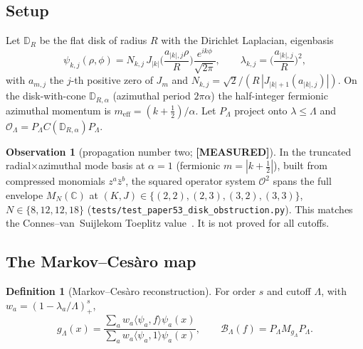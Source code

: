 \documentclass[11pt,a4paper]{article}
\theoremstyle{plain}
\theoremstyle{definition}
\newtheorem{definition}[theorem]{Definition}
\newtheorem{observation}[theorem]{Observation}
\newcommand{\disk}{\mathbb{D}}
\newcommand{\diskR}{\disk_{R}}
\newcommand{\cone}{\disk_{R,\alpha}}
\newcommand{\Op}{\mathcal{O}}
\newcommand{\Berez}{\mathcal{B}}
\newcommand{\C}{\mathbb{C}}
\begin{document}
\subsection{Setup}
Let $\diskR$ be the flat disk of radius $R$ with the Dirichlet Laplacian,
eigenbasis
\begin{equation}
\psi_{k,j}(\rho,\phi)=N_{k,j}\,J_{|k|}\!\Big(\frac{a_{|k|,j}\rho}{R}\Big)
\frac{e^{ik\phi}}{\sqrt{2\pi}},\qquad
\lambda_{k,j}=\Big(\frac{a_{|k|,j}}{R}\Big)^{2},
\label{eq:eigenbasis}
\end{equation}
with $a_{m,j}$ the $j$-th positive zero of $J_{m}$ and
$N_{k,j}=\sqrt{2}/(R\,|J_{|k|+1}(a_{|k|,j})|)$. On the disk-with-cone
$\cone$ (azimuthal period $2\pi\alpha$) the half-integer fermionic
azimuthal momentum is $m_{\mathrm{eff}}=(k+\tfrac12)/\alpha$. Let
$P_{\Lambda}$ project onto $\lambda\le\Lambda$ and
$\Op_{\Lambda}=P_{\Lambda}C(\cone)P_{\Lambda}$.

\begin{observation}[propagation number two; \textbf{[MEASURED]}]
\label{prop:prop2}
In the truncated radial$\times$azimuthal mode basis at $\alpha=1$ (fermionic
$m=|k+\tfrac12|$), built from compressed monomials $z^{a}\bar z^{b}$, the
squared operator system $\Op^{2}$ spans the full envelope $M_{N}(\C)$ at
$(K,J)\in\{(2,2),(2,3),(3,2),(3,3)\}$, $N\in\{8,12,12,18\}$
(\texttt{tests/test\_paper53\_disk\_obstruction.py}). This matches the
Connes--van~Suijlekom Toeplitz value~\cite{connes_vs2021}. It is not proved
for all cutoffs.
\end{observation}

\subsection{The Markov--Ces\`aro map}
\begin{definition}[Markov--Ces\`aro reconstruction]\label{def:berezin}
For order $s$ and cutoff $\Lambda$, with $w_{a}=(1-\lambda_{a}/\Lambda)_{+}^{s}$,
\begin{equation}
g_{\Lambda}(x)=
\frac{\sum_{a}w_{a}\langle\psi_{a},f\rangle\psi_{a}(x)}
{\sum_{a}w_{a}\langle\psi_{a},1\rangle\psi_{a}(x)},
\qquad
\Berez_{\Lambda}(f)=P_{\Lambda}M_{g_{\Lambda}}P_{\Lambda}.
\label{eq:berezin}
\end{equation}
\end{definition}
\end{document}
